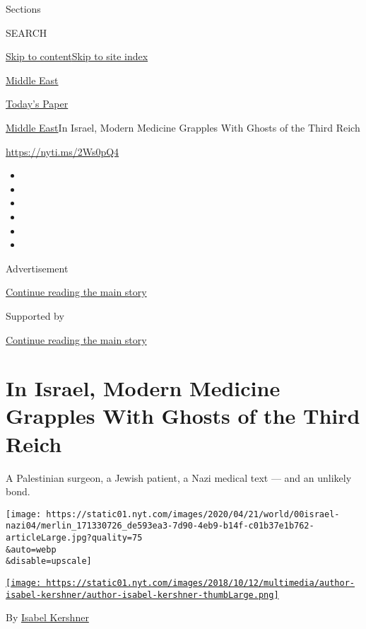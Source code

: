 Sections

SEARCH

\protect\hyperlink{site-content}{Skip to
content}\protect\hyperlink{site-index}{Skip to site index}

\href{https://www.nytimes.com/section/world/middleeast}{Middle East}

\href{https://myaccount.nytimes.com/auth/login?response_type=cookie\&client_id=vi}{}

\href{https://www.nytimes.com/section/todayspaper}{Today's Paper}

\href{/section/world/middleeast}{Middle East}\textbar{}In Israel, Modern
Medicine Grapples With Ghosts of the Third Reich

\url{https://nyti.ms/2Ws0pQ4}

\begin{itemize}
\item
\item
\item
\item
\item
\item
\end{itemize}

Advertisement

\protect\hyperlink{after-top}{Continue reading the main story}

Supported by

\protect\hyperlink{after-sponsor}{Continue reading the main story}

\hypertarget{in-israel-modern-medicine-grapples-with-ghosts-of-the-third-reich}{%
\section{In Israel, Modern Medicine Grapples With Ghosts of the Third
Reich}\label{in-israel-modern-medicine-grapples-with-ghosts-of-the-third-reich}}

A Palestinian surgeon, a Jewish patient, a Nazi medical text --- and an
unlikely bond.

\texttt{[image: https://static01.nyt.com/images/2020/04/21/world/00israel-nazi04/merlin\_171330726\_de593ea3-7d90-4eb9-b14f-c01b37e1b762-articleLarge.jpg?quality=75\\\&auto=webp\\\&disable=upscale]}

\href{https://www.nytimes.com/by/isabel-kershner}{\texttt{[image: https://static01.nyt.com/images/2018/10/12/multimedia/author-isabel-kershner/author-isabel-kershner-thumbLarge.png]}}

By \href{https://www.nytimes.com/by/isabel-kershner}{Isabel Kershner}

